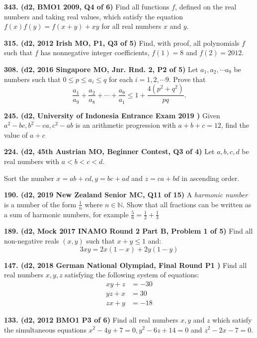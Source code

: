 \documentclass{article}
\begin{document}
\textbf{343. (\color{red}d2\color{black}, BMO1 2009, Q4 of 6)} Find all functions $f$, defined on the real numbers and taking real values, which satisfy the equation $f(x)f(y) = f(x + y) + xy$ for all real numbers $x$ and $y$.

\textbf{315. (\color{red}d2\color{black}, 2012 Irish MO, P1, Q3 of 5)} Find, with proof, all polynomials $f$ such that $f$ has nonnegative integer coefficients, $f(1) = 8$ and $f(2) = 2012$.

\textbf{308. (\color{red}d2\color{black}, 2016 Singapore MO, Jnr. Rnd. 2, P2 of 5)} Let $a_1, a_2, \cdots a_9$ be numbers such that $0 \leq p \leq a_i \leq q$ for each $i = 1, 2, \cdots 9$. Prove that \[\frac{a_1}{a_9} + \frac{a_2}{a_8} + \cdots + \frac{a_9}{a_1} \leq 1 + \frac{4(p^2+q^2)}{pq}.\]

\textbf{245. (\color{red}d2\color{black}, University of Indonesia Entrance Exam 2019 )} Given $a^2 - bc, b^2-ca , c^2 -ab$ is an arithmetic progression with $a+b+c = 12$, find the value of $a+c$

\textbf{224. (\color{red}d2\color{black}, 45th Austrian MO, Beginner Contest, Q3 of 4)} Let $a,b,c,d$ be real numbers with $a<b<c<d$.



\vspace{2mm}



Sort the number $x = ab+cd , y = bc+ad$ and $z = ca+bd$ in ascending order.

\textbf{190. (\color{red}d2\color{black}, 2019 New Zealand Senior MC, Q11 of 15)} A \textit{harmonic number} is a number of the form $\frac{1}{n}$ where $n \in \mathbb{N}$. Show that all fractions can be written as a sum of harmonic numbers, for example $\frac56 = \frac12 + \frac13$

\textbf{189. (\color{red}d2\color{black}, Mock 2017 INAMO Round 2 Part B, Problem 1 of 5)} Find all non-negative reals $(x,y)$ such that $x+y \leq 1$ and:
$$3xy = 2x(1-x) + 2y(1-y)$$

\textbf{147. (\color{red}d2\color{black}, 2018 German National Olympiad, Final Round P1
    )} Find all real numbers \(x,y,z\) satisfying the following system of equations:
\begin{align*}
    xy+z & =-30 \\
    yz+x & = 30 \\
    zx+y & =-18
\end{align*}

\textbf{133. (\color{red}d2\color{black}, 2012 BMO1 P3 of 6)} Find all real numbers \(x, y\) and \(z\) which satisfy the simultaneous equations \(x^2 - 4y + 7 = 0, y^2 - 6z + 14 = 0\) and \(z^2 - 2x - 7 = 0\).
\end{document}
